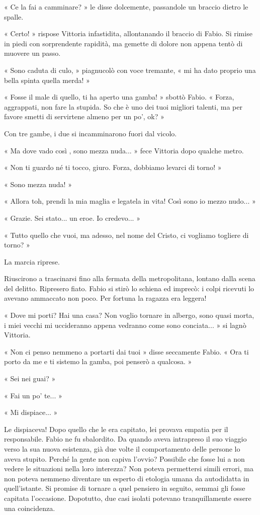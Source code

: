 « Ce la fai a camminare? » le disse dolcemente, passandole un braccio dietro le spalle.

« Certo! » rispose Vittoria infastidita, allontanando il braccio di Fabio. Si rimise in piedi con sorprendente rapidità, ma gemette di dolore non appena tentò di muovere un passo.

« Sono caduta di culo, » piagnucolò con voce tremante, « mi ha dato proprio una bella spinta quella merda! »

« Fosse il male di quello, ti ha aperto una gamba! » sbottò Fabio. « Forza, aggrappati, non fare la stupida. So che è uno dei tuoi migliori talenti, ma per favore smetti di servirtene almeno per un po', ok?  »

Con tre gambe, i due si incamminarono fuori dal vicolo.

« Ma dove vado così , sono mezza nuda... » fece Vittoria dopo qualche metro.

« Non ti guardo né ti tocco, giuro. Forza, dobbiamo levarci di torno! »

« Sono mezza nuda! »

« Allora toh, prendi la mia maglia e legatela in vita! Così sono io mezzo nudo... »

« Grazie. Sei stato... un eroe. Io credevo... »

« Tutto quello che vuoi, ma adesso, nel nome del Cristo, ci vogliamo togliere di torno? »

La marcia riprese.

Riuscirono a trascinarsi fino alla fermata della metropolitana, lontano dalla scena del delitto. Ripresero fiato. Fabio si stirò lo schiena ed imprecò: i colpi ricevuti lo avevano ammaccato non poco. Per fortuna la ragazza era leggera!

« Dove mi porti? Hai una casa? Non voglio tornare in albergo, sono quasi morta, i miei vecchi mi uccideranno appena vedranno come sono conciata... » si lagnò Vittoria.

« Non ci penso nemmeno a portarti dai tuoi » disse seccamente Fabio. « Ora ti porto da me e ti sistemo la gamba, poi penserò a qualcosa. »

« Sei nei guai? »

« Fai un po' te... »

« Mi dispiace... »

Le dispiaceva! Dopo quello che le era capitato, lei provava empatia per il responsabile. Fabio ne fu sbalordito. Da quando aveva intrapreso il suo viaggio verso la sua nuova esistenza, già due volte il comportamento delle persone lo aveva stupito. Perché la gente non capiva l'ovvio? Possibile che fosse lui a non vedere le situazioni nella loro interezza? Non poteva permettersi simili errori, ma non poteva nemmeno diventare un esperto di etologia umana da autodidatta in quell'istante. Si promise di tornare a quel pensiero in seguito, semmai gli fosse capitata l'occasione. Dopotutto, due casi isolati potevano tranquillamente essere una coincidenza.

